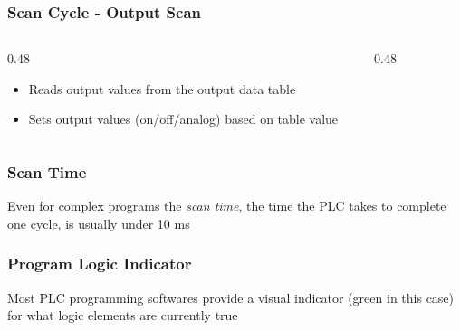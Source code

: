 \begin{frame}
    \frametitle{Scan Cycle - Output Scan}

    \begin{columns}
        \begin{column}{0.48\linewidth}
            \begin{itemize}
                \item Reads output values from the output data table
                \item Sets output values (on/off/analog) based on table value
            \end{itemize}
        \end{column}
        \begin{column}{0.48\linewidth}
            \begin{figure}
                \centering
                \resizebox{0.9\columnwidth}{!}{
                    
                }
            \end{figure}
        \end{column}
    \end{columns}
\end{frame}

\begin{frame}
    \frametitle{Scan Time}

    \begin{figure}
        \centering
        \resizebox{0.375\linewidth}{!}{
            
        }
    \end{figure}

    \vspace{0.5em}
    \centering
    {\footnotesize Even for complex programs the \emph{scan time}, the time the PLC takes to complete one cycle, is usually under 10 ms\par}
\end{frame}

\begin{frame}
    \frametitle{Program Logic Indicator}

    \begin{figure}
        \centering
        \resizebox{0.75\linewidth}{!}{
            
        }
    \end{figure}

    \vspace{0.5em}
    \centering
    {\footnotesize Most PLC programming softwares provide a visual indicator (green in this case) for what logic elements are currently true\par}
\end{frame}

